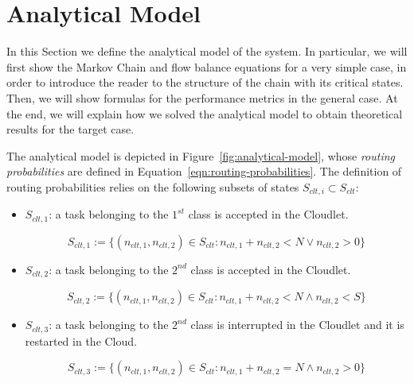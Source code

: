 \section{Analytical Model}
\label{sec:analytical-model}
In this Section we define the analytical model of the system.
%
In particular, we will first show the Markov Chain and flow balance equations for a very simple case, in order to introduce the reader to the structure of the chain with its critical states.
%
Then, we will show formulas for the performance metrics in the general case.
%
At the end, we will explain how we solved the analytical model to obtain theoretical results for the target case.

The analytical model is depicted in Figure~\ref{fig:analytical-model}, whose \textit{routing probabilities} are defined in Equation~\ref{eqn:routing-probabilities}.
The definition of routing probabilities relies on the following subsets of states $S_{clt,i} \subset S_{clt}$:

\begin{itemize}
	\item $S_{clt,1}$:  a task belonging to the $1^{st}$ class is accepted in the Cloudlet.
	
	\begin{equation}
	S_{clt,1} := \{(n_{clt,1},n_{clt,2})\in S_{clt} : n_{clt,1}+n_{clt,2}<N \vee n_{clt,2}>0\}
	\end{equation}
	
	\item $S_{clt,2}$: a task belonging to the $2^{nd}$ class is accepted in the Cloudlet.
	
	\begin{equation}
	S_{clt,2} := \{(n_{clt,1},n_{clt,2})\in S_{clt} : n_{clt,1}+n_{clt,2}<N \wedge n_{clt,2}<S\}
	\end{equation}
	
	\item $S_{clt,3}$: a task belonging to the $2^{nd}$ class is interrupted in the Cloudlet and it is restarted in the Cloud.
	
	\begin{equation}
	S_{clt,3} := \{(n_{clt,1},n_{clt,2})\in S_{clt} : n_{clt,1}+n_{clt,2}=N \wedge n_{clt,2}>0\}
	\end{equation}
\end{itemize}

